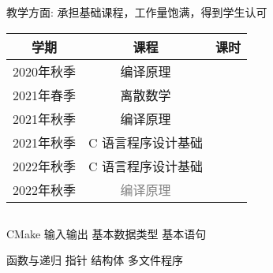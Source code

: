 
\begin{frame}{}
\end{frame}

\begin{frame}{教学方面: 承担基础课程，工作量饱满，得到学生认可}
  \begin{table}[t]
    \centering
    \renewcommand\arraystretch{1.2}
    \begin{tabular}[]{c|c|c}
      \hline
      学期       & 课程                       & 课时 \\ \hline \hline
      2020年秋季 & 编译原理                   &      \\ \hline
      2021年春季 & 离散数学                   &      \\ \hline
      2021年秋季 & 编译原理                   &      \\ \hline
      2021年秋季 & C 语言程序设计基础         &      \\ \hline
      2022年秋季 & C 语言程序设计基础         &      \\ \hline
      2022年秋季 & \textcolor{gray}{编译原理} &      \\ \hline
    \end{tabular}
  \end{table}

  \begin{columns}
  \end{columns}
\end{frame}

\begin{frame}{}
\end{frame}

\begin{frame}{}
  \begin{center}
    CMake \quad 输入输出 \quad 基本数据类型 \quad 基本语句

    \vspace{1.00cm}
    \href{https://courses-at-nju-by-hfwei.github.io/c-pl-lectures/}{}
    \vspace{1.00cm}

    函数与递归 \quad 指针 \quad 结构体 \quad 多文件程序
  \end{center}
\end{frame}

